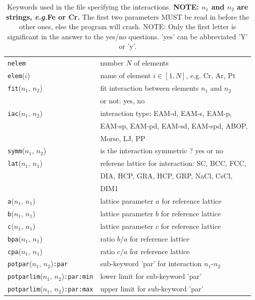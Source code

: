 \documentclass[a4paper,12pt,onecolumn]{article}
\makeatletter
\newcommand{\eg}{\emph{e.g.\@\xspace}}
\makeatother
\begin{document}
\begin{table}[!h]
\caption{
Keywords used in the file specifying the interactions.
\textbf{NOTE: $n_1$ and $n_2$ are strings, \eg Fe or Cr.}
The first two parameters MUST be read in before the other ones,
else the program will crash.
NOTE: Only the first letter is significant in the answer to the yes/no questions.
'yes' can be abbreviated 'Y' or 'y'.
\label{tab:kw-if}
}
\begin{center}
\begin{tabular}{|l|l|}
\hline
\hline
\verb+nelem+       & number $N$ of elements \\
\verb+elem+($i$)   & name of element $i \in [1,N]$, e.g. Cr, Ar, Pt \\
\hline
\verb+fit+($n_1$, $n_2$) & fit interaction between elements $n_1$ and $n_2$ \\
                          & or not: yes, no \\
\verb+iac+($n_1$, $n_2$) & interaction type: EAM-d, EAM-s, EAM-p,\\
                          & EAM-sp, EAM-pd, EAM-sd, EAM-spd, ABOP, \\
                          & Morse, LJ, PP \\
\verb+symm+($n_1$, $n_2$) & is the interaction symmetric ? yes or no \\
\hline
\verb+lat+($n_1$, $n_1$) & referene lattice for interaction: SC, BCC, FCC, \\
                          & DIA, HCP, GRA, HCP, GRP, NaCl, CsCl, \\
                          & DIM1 \\
\verb+a+($n_1$, $n_1$) & lattice parameter $a$ for reference lattice \\
\verb+b+($n_1$, $n_1$) & lattice parameter $b$ for reference lattice \\
\verb+c+($n_1$, $n_1$) & lattice parameter $c$ for reference lattice \\
\verb+bpa+($n_1$, $n_1$) & ratio $b/a$ for reference lattice \\
\verb+cpa+($n_1$, $n_1$) & ratio $c/a$ for reference lattice \\
\hline
\verb+potpar+($n_1$, $n_2$)\verb+:par+ & sub-keyword 'par' for interaction $n_1$-$n_2$ \\
\verb+potparlim+($n_1$, $n_2$)\verb+:par:min+ & lower limit for sub-keyword 'par' \\
\verb+potparlim+($n_1$, $n_2$)\verb+:par:max+ & upper limit for sub-keyword 'par' \\
\hline
\hline
\end{tabular}
\end{center}
\end{table}
\end{document}
